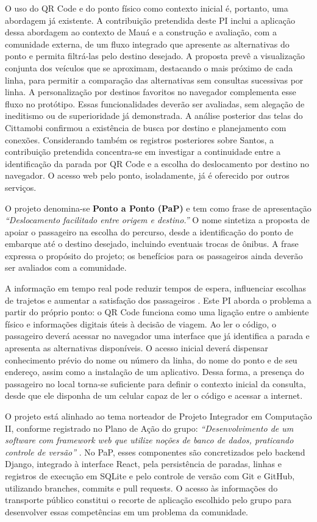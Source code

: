 \documentclass[12pt,oneside,a4paper,brazil,chapter=TITLE]{abntex2}
\begin{document}
O uso do QR Code e do ponto físico como contexto inicial é, portanto, uma abordagem já existente. A contribuição pretendida deste PI inclui a aplicação dessa abordagem ao contexto de Mauá e a construção e avaliação, com a comunidade externa, de um fluxo integrado que apresente as alternativas do ponto e permita filtrá-las pelo destino desejado. A proposta prevê a visualização conjunta dos veículos que se aproximam, destacando o mais próximo de cada linha, para permitir a comparação das alternativas sem consultas sucessivas por linha. A personalização por destinos favoritos no navegador complementa esse fluxo no protótipo. Essas funcionalidades deverão ser avaliadas, sem alegação de ineditismo ou de superioridade já demonstrada. A análise posterior das telas do Cittamobi confirmou a existência de busca por destino e planejamento com conexões. Considerando também os registros posteriores sobre Santos, a contribuição pretendida concentra-se em investigar a continuidade entre a identificação da parada por QR Code e a escolha do deslocamento por destino no navegador. O acesso web pelo ponto, isoladamente, já é oferecido por outros serviços.

O projeto denomina-se \textbf{Ponto a Ponto (PaP)} e tem como frase de apresentação \textit{``Deslocamento facilitado entre origem e destino.''} O nome sintetiza a proposta de apoiar o passageiro na escolha do percurso, desde a identificação do ponto de embarque até o destino desejado, incluindo eventuais trocas de ônibus. A frase expressa o propósito do projeto; os benefícios para os passageiros ainda deverão ser avaliados com a comunidade.

A informação em tempo real pode reduzir tempos de espera, influenciar escolhas de trajetos e aumentar a satisfação dos passageiros \citep{brakewood2019}. Este PI aborda o problema a partir do próprio ponto: o QR Code funciona como uma ligação entre o ambiente físico e informações digitais úteis à decisão de viagem. Ao ler o código, o passageiro deverá acessar no navegador uma interface que já identifica a parada e apresenta as alternativas disponíveis. O acesso inicial deverá dispensar conhecimento prévio do nome ou número da linha, do nome do ponto e de seu endereço, assim como a instalação de um aplicativo. Dessa forma, a presença do passageiro no local torna-se suficiente para definir o contexto inicial da consulta, desde que ele disponha de um celular capaz de ler o código e acessar a internet.

O projeto está alinhado ao tema norteador de Projeto Integrador em Computação II, conforme registrado no Plano de Ação do grupo: \textit{``Desenvolvimento de um software com framework web que utilize noções de banco de dados, praticando controle de versão''} \citep[p.~1]{planoacao2026}. No PaP, esses componentes são concretizados pelo backend Django, integrado à interface React, pela persistência de paradas, linhas e registros de execução em SQLite e pelo controle de versão com Git e GitHub, utilizando branches, commits e pull requests. O acesso às informações do transporte público constitui o recorte de aplicação escolhido pelo grupo para desenvolver essas competências em um problema da comunidade.
\end{document}
